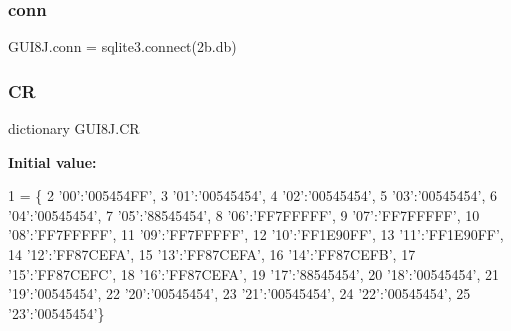 \subsubsection{\texorpdfstring{conn}{conn}}
{\footnotesize\ttfamily G\+U\+I8\+J.\+conn = sqlite3.\+connect(\textquotesingle{}2b.\+db\textquotesingle{})}

\mbox{\label{namespaceGUI8J_a22559156071a0e55de6499cb7c11bc13}} 
\subsubsection{\texorpdfstring{CR}{CR}}
{\footnotesize\ttfamily dictionary G\+U\+I8\+J.\+CR}

{\bfseries Initial value\+:}
\begin{DoxyCode}
1 =  \{
2 \textcolor{stringliteral}{'00'}:\textcolor{stringliteral}{'005454FF'},
3 \textcolor{stringliteral}{'01'}:\textcolor{stringliteral}{'00545454'},
4 \textcolor{stringliteral}{'02'}:\textcolor{stringliteral}{'00545454'},
5 \textcolor{stringliteral}{'03'}:\textcolor{stringliteral}{'00545454'},
6 \textcolor{stringliteral}{'04'}:\textcolor{stringliteral}{'00545454'},
7 \textcolor{stringliteral}{'05'}:\textcolor{stringliteral}{'88545454'},
8 \textcolor{stringliteral}{'06'}:\textcolor{stringliteral}{'FF7FFFFF'},
9 \textcolor{stringliteral}{'07'}:\textcolor{stringliteral}{'FF7FFFFF'},
10 \textcolor{stringliteral}{'08'}:\textcolor{stringliteral}{'FF7FFFFF'},
11 \textcolor{stringliteral}{'09'}:\textcolor{stringliteral}{'FF7FFFFF'},
12 \textcolor{stringliteral}{'10'}:\textcolor{stringliteral}{'FF1E90FF'},
13 \textcolor{stringliteral}{'11'}:\textcolor{stringliteral}{'FF1E90FF'},
14 \textcolor{stringliteral}{'12'}:\textcolor{stringliteral}{'FF87CEFA'},
15 \textcolor{stringliteral}{'13'}:\textcolor{stringliteral}{'FF87CEFA'},
16 \textcolor{stringliteral}{'14'}:\textcolor{stringliteral}{'FF87CEFB'},
17 \textcolor{stringliteral}{'15'}:\textcolor{stringliteral}{'FF87CEFC'},
18 \textcolor{stringliteral}{'16'}:\textcolor{stringliteral}{'FF87CEFA'},
19 \textcolor{stringliteral}{'17'}:\textcolor{stringliteral}{'88545454'},
20 \textcolor{stringliteral}{'18'}:\textcolor{stringliteral}{'00545454'},
21 \textcolor{stringliteral}{'19'}:\textcolor{stringliteral}{'00545454'},
22 \textcolor{stringliteral}{'20'}:\textcolor{stringliteral}{'00545454'},
23 \textcolor{stringliteral}{'21'}:\textcolor{stringliteral}{'00545454'},
24 \textcolor{stringliteral}{'22'}:\textcolor{stringliteral}{'00545454'},
25 \textcolor{stringliteral}{'23'}:\textcolor{stringliteral}{'00545454'}\}
\end{DoxyCode}
\mbox{\label{namespaceGUI8J_a9071a3df4f37ae26036b57996e85e7e3}} 
